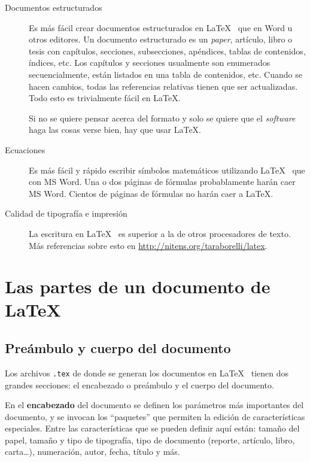 \documentclass[12pt,letterpaper]{article}
\begin{document}
\begin{description}

\item[Documentos estructurados] 
Es más fácil crear documentos estructurados en \LaTeX~ que en Word u otros editores. Un documento estructurado es un \emph{paper}, artículo, libro o tesis con capítulos, secciones, subsecciones, apéndices, tablas de contenidos, índices, etc. Los capítulos y secciones usualmente son enumerados secuencialmente, están listados en una tabla de contenidos, etc. Cuando se hacen cambios, todas las referencias relativas tienen que ser actualizadas. Todo esto es trivialmente fácil en \LaTeX.

Si no se quiere pensar acerca del formato y solo se quiere que el \emph{software} haga las cosas verse bien, hay que usar \LaTeX.

\item[Ecuaciones] 
Es más fácil y rápido escribir símbolos matemáticos utilizando \LaTeX~ que con MS Word. Una o dos páginas de fórmulas probablamente harán caer MS Word. Cientos de páginas de fórmulas no harán caer a \LaTeX.

\item[Calidad de tipografía e impresión] 
La escritura en \LaTeX~ es superior a la de otros procesadores de texto. Más referencias sobre esto en \url{http://nitens.org/taraborelli/latex}.

\end{description}

\section{Las partes de un documento de \LaTeX}

\subsection{Preámbulo y cuerpo del documento}

Los archivos \texttt{.tex} de donde se generan los documentos en \LaTeX~ tienen dos grandes secciones: el encabezado o preámbulo y el cuerpo del documento.

En el \textbf{encabezado} del documento se definen los parámetros más importantes del documento, y se invocan los ``paquetes'' que permiten la edición de características especiales. Entre las características que se pueden definir aquí están: tamaño del papel, tamaño y tipo de tipografía, tipo de documento (reporte, artículo, libro, carta\ldots), numeración, autor, fecha, título y más. 
\end{document}
